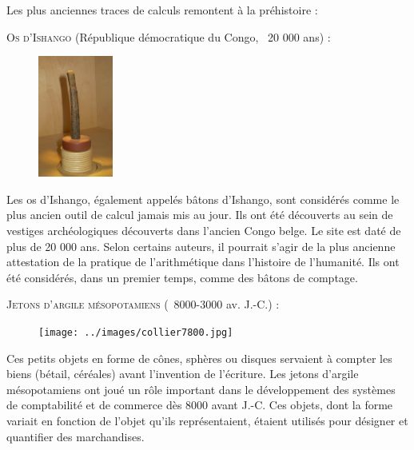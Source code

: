 Les plus anciennes traces de calculs remontent à la préhistoire :

\vspace{.5cm}



\textsc{Os d'Ishango} (République démocratique du Congo, ~20 000 ans) : 

\vspace{.2cm}

\begin{figure} %
    \vspace{-0.65cm} %
    \includegraphics[width=0.22\textwidth]{../images/Os-Ishango.jpeg}
\end{figure}

Les os d'Ishango, également appelés bâtons d'Ishango, sont considérés comme le plus ancien outil de calcul jamais mis au jour. Ils ont été découverts au sein de vestiges archéologiques découverts dans l'ancien Congo belge. Le site est daté de plus de 20 000 ans. Selon certains auteurs, il pourrait s'agir de la plus ancienne attestation de la pratique de l'arithmétique dans l'histoire de l'humanité. Ils ont été considérés, dans un premier temps, comme des bâtons de comptage. 


\newpage

\textsc{ Jetons d'argile mésopotamiens} (~8000-3000 av. J.-C.) : 

\vspace{.2cm}

\begin{figure} %
    \vspace{-0.6cm} %
    \texttt{[image: ../images/collier7800.jpg]}
\end{figure}

Ces petits objets en forme de cônes, sphères ou disques servaient à compter les biens (bétail, céréales) avant l'invention de l'écriture. Les jetons d'argile mésopotamiens ont joué un rôle important dans le développement des systèmes de comptabilité et de commerce dès 8000 avant J.-C. Ces objets, dont la forme variait en fonction de l'objet qu'ils représentaient, étaient utilisés pour désigner et quantifier des marchandises.

